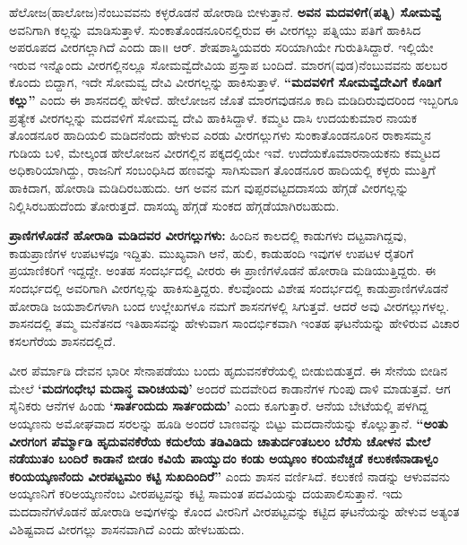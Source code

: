 ಹೆಲೋಜ(ಹಾಲೋಜ)ನೆಂಬುವವನು ಕಳ್ಳರೊಡನೆ ಹೋರಾಡಿ ಬೀಳುತ್ತಾನೆ. \textbf{ಅವನ ಮದವಳಿಗೆ(ಪತ್ನಿ) ಸೋಮವ್ವೆ } ಅವನಿಗಾಗಿ ಕಲ್ಲನ್ನು ಮಾಡಿಸುತ್ತಾಳೆ. ಸುಂಕಾತೊಂಡನೂರಿನಲ್ಲಿರುವ ಈ ವೀರಗಲ್ಲು ಪತ್ನಿಯು ಪತಿಗೆ ಹಾಕಿಸಿದ ಅಪರೂಪದ ವೀರಗಲ್ಲಾಗಿದೆ ಎಂದು ಡಾ॥ ಆರ್​. ಶೇಷಶಾಸ್ತ್ರಿಯವರು ಸರಿಯಾಗಿಯೇ ಗುರುತಿಸಿದ್ದಾರೆ. ಇಲ್ಲಿಯೇ ಇರುವ ಇನ್ನೊಂದು ವೀರಗಲ್ಲಿನಲ್ಲೂ ಸೋಮವ್ವೆದೇವಿಯ ಪ್ರಸ್ತಾಪ ಬಂದಿದೆ. ಮಾರಗ(ವುಡ)ನೆಂಬುವವನು ಹಲಬರ ಕೊಂದು ಬಿದ್ದಾಗ, ಇದೇ ಸೋಮವ್ವ ದೇವಿ ವೀರಗಲ್ಲನ್ನು ಹಾಕಿಸುತ್ತಾಳೆ. \textbf{“ಮದವಳಿಗೆ ಸೋಮವ್ವೆದೇವಿಗೆ ಕೊಡಿಗೆ ಕಲ್ಲು”} ಎಂದು ಈ ಶಾಸನದಲ್ಲಿ ಹೇಳಿದೆ. ಹೇಲೋಜನ ಜೊತೆ ಮಾರಗವುಡನೂ ಕಾದಿ ಮಡಿದಿರುವುದರಿಂದ ಇಬ್ಬರಿಗೂ ಪ್ರತ್ಯೇಕ ವೀರಗಲ್ಲನ್ನು ಮದವಳಿಗೆ ಸೋಮವ್ವ ದೇವಿ ಹಾಕಿಸಿದ್ದಾಳೆ. ಕಮ್ಮಟ ದಾಸಿ ಉದಯಕುಮಾರ ನಾಯಕ ತೊಂಡನೂರ ಹಾದಿಯಲಿ ಮಡಿದನೆಂದು ಹೇಳುವ ಎರಡು ವೀರಗಲ್ಲುಗಳು ಸುಂಕಾತೊಂಡನೂರಿನ ರಾಕಾಸಮ್ಮನ ಗುಡಿಯ ಬಳಿ, ಮೇಲ್ಕಂಡ ಹೇಲೋಜನ ವೀರಗಲ್ಲಿನ ಪಕ್ಕದಲ್ಲಿಯೇ ಇವೆ. ಉದೆಯಕೊಮಾರನಾಯಕನು ಕಮ್ಮಟದ ಅಧಿಕಾರಿಯಾಗಿದ್ದು, ರಾಜನಿಗೆ ಸಂಬಂಧಿಸಿದ ಹಣವನ್ನು ಸಾಗಿಸುವಾಗ ತೊಂಡನೂರ ಹಾದಿಯಲ್ಲಿ ಕಳ್ಳರು ಮುತ್ತಿಗೆ ಹಾಕಿದಾಗ, ಹೋರಾಡಿ ಮಡಿದಿರಬಹುದು. ಆಗ ಅವನ ಮಗ ವುಪ್ಪರವಟ್ಟದ\break ದಾಸಯ ಹೆಗ್ಗಡೆ ವೀರಗಲ್ಲನ್ನು ನಿಲ್ಲಿಸಿರಬಹುದೆಂದು ತೋರುತ್ತದೆ. ದಾಸಯ್ಯ ಹೆಗ್ಗಡೆ ಸುಂಕದ ಹೆಗ್ಗಡೆಯಾಗಿರಬಹುದು.

\textbf{ಪ್ರಾಣಿಗಳೊಡನೆ ಹೋರಾಡಿ ಮಡಿದವರ ವೀರಗಲ್ಲುಗಳು:} ಹಿಂದಿನ ಕಾಲದಲ್ಲಿ ಕಾಡುಗಳು ದಟ್ಟವಾಗಿದ್ದವು, ಕಾಡುಪ್ರಾಣಿಗಳ ಉಪಟಳವೂ ಇದ್ದಿತು. ಮುಖ್ಯವಾಗಿ ಆನೆ, ಹುಲಿ, ಕಾಡುಹಂದಿ ಇವುಗಳ ಉಪಟಳ ರೈತರಿಗೆ ಪ್ರಯಾಣಿಕರಿಗೆ ಇದ್ದದ್ದೇ. ಅಂತಹ ಸಂದರ್ಭದಲ್ಲಿ ವೀರರು ಈ ಪ್ರಾಣಿಗಳೊಡನೆ ಹೋರಾಡಿ ಮಡಿಯುತ್ತಿದ್ದರು. ಈ ಸಂದರ್ಭದಲ್ಲಿ ಅವರಿಗಾಗಿ ವೀರಗಲ್ಲನ್ನು ಹಾಕಿಸುತ್ತಿದ್ದರು. ಕೆಲವೊಂದು ವಿಶೇಷ ಸಂದರ್ಭದಲ್ಲಿ ಕಾಡುಪ್ರಾಣಿಗಳೊಡನೆ ಹೋರಾಡಿ ಜಯಶಾಲಿಗಳಾಗಿ ಬಂದ ಉಲ್ಲೇಖಗಳೂ ನಮಗೆ ಶಾಸನಗಳಲ್ಲಿ ಸಿಗುತ್ತವೆ. ಆದರೆ ಅವು ವೀರಗಲ್ಲುಗಳಲ್ಲ. ಶಾಸನದಲ್ಲಿ ತಮ್ಮ ಮನೆತನದ ಇತಿಹಾಸವನ್ನು ಹೇಳುವಾಗ ಸಾಂದರ್ಭಿಕವಾಗಿ ಇಂತಹ ಘಟನೆಯನ್ನು ಹೇಳಿರುವ ವಿಚಾರ ಕಸಲಗೆರೆಯ ಶಾಸನದಲ್ಲಿದೆ.

ವೀರ ಪೆರ್ಮಾಡಿ ದೇವನ ಭಾರೀ ಸೇನಾಪಡೆಯು ಬಂದು ಹೃದುವನಕೆರೆಯಲ್ಲಿ ಬೀಡುಬಿಡುತ್ತದೆ. ಈ ಸೇನೆಯ ಬೀಡಿನ ಮೇಲೆ \textbf{‘ಮದಗಂಧೇಭ ಮದಾನ್ಧ ವಾರಿಚಯವು’} ಅಂದರೆ ಮದವೇರಿದ ಕಾಡಾನೆಗಳ ಗುಂಪು ದಾಳಿ ಮಾಡುತ್ತವೆ. ಆಗ ಸೈನಿಕರು ಆನೆಗಳ ಹಿಂಡು \textbf{‘ಸಾರ್ತಂದುದು ಸಾರ್ತಂದುದು’} ಎಂದು ಕೂಗುತ್ತಾರೆ. ಆನೆಯ ಬೇಟೆಯಲ್ಲಿ ಪಳಗಿದ್ದ ಅಯ್ಕಣನು ಅಮೋಘವಾದ ಸರಲನ್ನು ಹೂಡಿ ಅಂದರೆ ಬಾಣವನ್ನು ಬಿಟ್ಟು ಮದದಾನೆಯನ್ನು ಕೊಲ್ಲುತ್ತಾನೆ.\textbf{ “ಅಂತು ವೀರಗಂಗ ಪೆರ್ಮ್ಮಾಡಿ ಹೃದುವನಕೆರೆಯ ಕದುಲೆಯ ತಡಿವಿಡಿದು ಚಾತುರ್ದಂತಬಲಂ ಬೆರೆಸು ಚೋಳನ ಮೇಲೆ ನಡೆಯುತಂ ಬಂದಿರೆ ಕಾಡಾನೆ ಬೀಡಂ ಕವಿಯೆ ಪಾಯ್ವುದಂ ಕಂಡು ಅಯ್ಕಣಂ ಕರಿಯನೆಚ್ಚಡೆ ಕಲುಕಣಿನಾಡಾಳ್ವಂ ಕರಿಯಯ್ಕಣನೆಂದು ವೀರಪಟ್ಟಮಂ ಕಟ್ಟಿ ಸುಖದಿಂದಿರೆ”} ಎಂದು ಶಾಸನ ವರ್ಣಿಸಿದೆ. ಕಲುಕಣಿ ನಾಡನ್ನು ಆಳುವವನು ಅಯ್ಕಣನಿಗೆ ಕರಿಅಯ್ಕಣನೆಂಬ ವೀರಪಟ್ಟವನ್ನು ಕಟ್ಟಿ ಸಾಮಂತ ಪದವಿಯನ್ನು ದಯಪಾಲಿಸುತ್ತಾನೆ. ಇದು ಮದದಾನೆಗಳೊಡನೆ ಹೋರಾಡಿ ಅವುಗಳನ್ನು ಕೊಂದ ವೀರನಿಗೆ ವೀರಪಟ್ಟವನ್ನು ಕಟ್ಟಿದ ಘಟನೆಯನ್ನು ಹೇಳುವ ಅತ್ಯಂತ ವಿಶಿಷ್ಟವಾದ ವೀರಗಲ್ಲು ಶಾಸನವಾಗಿದೆ ಎಂದು ಹೇಳಬಹುದು.

